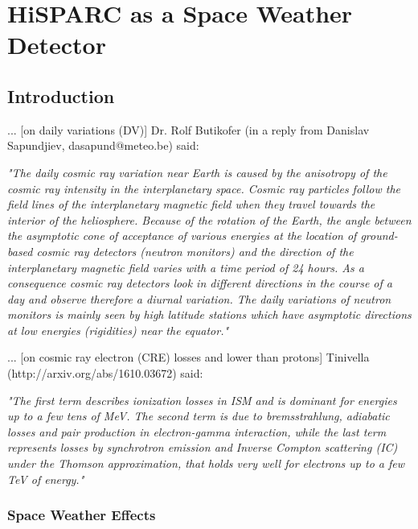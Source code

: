 \chapter{HiSPARC as a Space Weather Detector}\label{chap:HiSPARC}

\section{Introduction}\label{sec:HS_intro}

... [on daily variations (DV)] Dr. Rolf Butikofer (in a reply from Danislav Sapundjiev, dasapund@meteo.be) said:

\textit{"The daily cosmic ray variation near Earth is caused by the anisotropy of the cosmic ray intensity in the interplanetary space. Cosmic ray particles follow the field lines of the interplanetary magnetic field when they travel towards the interior of the heliosphere. Because of the rotation of the Earth, the angle between the asymptotic cone of acceptance of various energies at the location of ground-based cosmic ray detectors (neutron monitors) and the direction of the interplanetary magnetic field varies with a time period of 24 hours. As a consequence cosmic ray detectors look in different directions in the course of a day and observe therefore a diurnal variation. The daily variations of neutron monitors is mainly seen by high latitude stations which have asymptotic directions at low energies (rigidities) near the equator."}


... [on cosmic ray electron (CRE) losses and lower than protons] Tinivella (http://arxiv.org/abs/1610.03672) said:

\textit{"The first term describes ionization losses in ISM and is dominant for energies up to a few tens of MeV. The second term is due to bremsstrahlung, adiabatic losses and pair production in electron-gamma interaction, while the last term represents losses by synchrotron emission and Inverse Compton scattering (IC) under the Thomson approximation, that holds very well for electrons up to a few TeV of energy."}


\subsection{Space Weather Effects}

